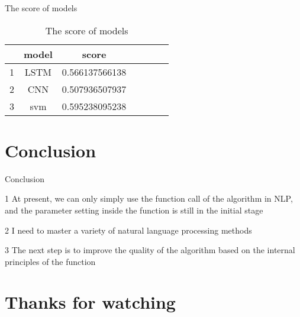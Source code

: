 \documentclass[
 size=12pt,
 paper=smartboard, %
 mode=present, %
 display=slides, %
style=tuliplab,
pauseslide,
fleqn,leqno]{powerdot}
\begin{document}
\begin{slide}[toc=,bm=]{The score of models}
  \begin{table}[htbp]  \centering
    \caption{The score of  models}
    \label{tbl:data information}
    \begin{tabular}{ccccccc}
      \hline
        & model          & score \\
      \hline
      1 &  LSTM          & 0.566137566138  \\
      2 &  CNN           & 0.507936507937  \\
      3 &  svm           & 0.595238095238  \\
     
      \hline 
    \end{tabular}
  \end{table}
\end{slide}

\section{Conclusion}
\begin{slide}[toc=,bm=]{Conclusion}
  \item[1] At present, we can only simply use the function call of the algorithm in NLP, and the parameter setting inside the function is still in the initial stage
  \item[2] I need to master a variety of natural language processing methods
  \item[3] The next step is to improve the quality of the algorithm based on the internal principles of the function
\end{slide}

\section{Thanks for watching}


\end{document}
